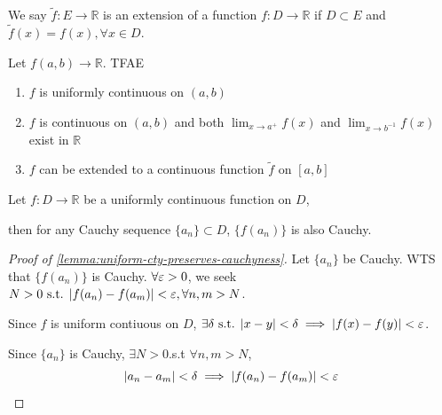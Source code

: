 \begin{definition}
    We say $\tilde{f}: E \to \mathbb{R}$ is an extension 
    of a function $f: D \to \mathbb{R}$ if $D \subset E$
    and $\tilde{f}(x) = f(x), \forall x \in D$.
\end{definition}


\begin{theorem}
    \label{thm:equivalent-characterization-of-uniform-continuity}
    Let $f(a, b) \to \mathbb{R}$. TFAE
    \begin{enumerate}
        \item $f$ is uniformly continuous on $(a, b)$
        \item $f$ is continuous on $(a,b)$ and both $\lim_{x \to a^+}f(x)$ and $\lim_{x \to b^{-1}}f(x)$
        exist in $\mathbb{R}$
        \item $f$ can be extended to a continuous function $\tilde{f}$ on $[a,b]$
    \end{enumerate} 
\end{theorem}

\begin{lemma}
    \label{lemma:uniform-cty-preserves-cauchyness}
    Let $f: D \to \mathbb{R}$ be a uniformly continuous function on $D$, 
    
    then for any Cauchy sequence
    $\{ a_n \} \subset D$, 
    $ \{ f(a_n) \} $ is also Cauchy. 
\end{lemma}

\begin{proof}[Proof of \ref{lemma:uniform-cty-preserves-cauchyness}]
    Let $ \{ a_n \} $ be Cauchy. WTS that $ \{ f(a_n) \} $ is Cauchy. 
    $\forall \varepsilon > 0$, we seek $N > 0 \text{ s.t. } |f(a_n) - f(a_m)| < \varepsilon, \forall n, m > N$. 
    \medskip

    Since $f$ is uniform contiuous on $D$, $\exists \delta \text{ s.t. } |x-y| < \delta \implies |f(x) - f(y) | < \varepsilon$. 
    \medskip

    Since $ \{ a_n \} $ is Cauchy, $\exists N > 0$.s.t 
    $\forall n, m > N$,
    \[
        |a_n - a_m| < \delta \implies |f(a_n) - f(a_m) | < \varepsilon
    \]
\end{proof}

